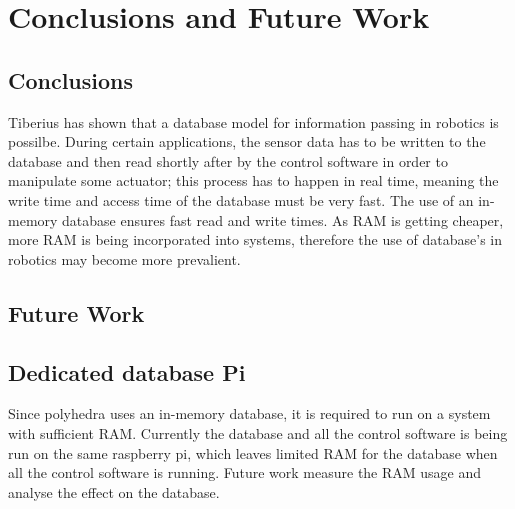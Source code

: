 \section{Conclusions and Future Work}
\subsection{Conclusions}
Tiberius has shown that a database model for information passing in robotics is possilbe. During certain applications, the sensor data has to be written to the database and then read shortly after by the control software in order to manipulate some actuator; this process has to happen in real time, meaning the write time and access time of the database must be very fast. The use of an in-memory database ensures fast read and write times. As RAM is getting cheaper, more RAM is being incorporated into systems, therefore the use of database's in robotics may become more prevalient.  

\subsection{Future Work}
\subsection{Dedicated database Pi}
Since polyhedra uses an in-memory database, it is required to run on a system with sufficient RAM. Currently the database and all the control software is being run on the same raspberry pi, which leaves limited RAM for the database when all the control software is running. Future work measure the RAM usage and analyse the effect on the database.






